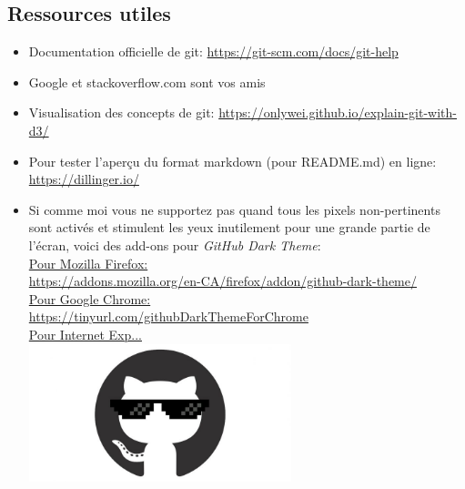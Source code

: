 \documentclass{article}
\begin{document}
\begin{center}\section{Ressources utiles}\end{center}
\begin{itemize}
  \item Documentation officielle de git: \url{https://git-scm.com/docs/git-help}
  
  \item Google et stackoverflow.com sont vos amis
  
  \item Visualisation des concepts de git: \url{https://onlywei.github.io/explain-git-with-d3/}
  
  \item Pour tester l'aperçu du format markdown (pour README.md) en ligne: \url{https://dillinger.io/}
  
  \item Si comme moi vous ne supportez pas quand tous les pixels non-pertinents sont activés et stimulent les yeux inutilement pour une grande partie de l'écran, voici des add-ons pour \textit{GitHub Dark Theme}:\\
    \underline{Pour Mozilla Firefox:}\\
    \url{https://addons.mozilla.org/en-CA/firefox/addon/github-dark-theme/}\\
    \underline{Pour Google Chrome:}\\
    \url{https://tinyurl.com/githubDarkThemeForChrome}\\
    \underline{Pour Internet Exp...}\\
    \includegraphics[width=0.6\textwidth, center]{Cool_Github_Logo}
\end{itemize}
\end{document}
